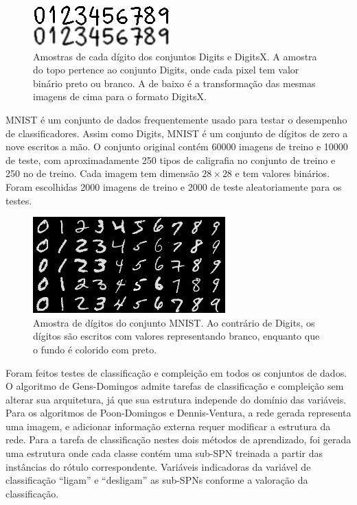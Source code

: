 \documentclass[12pt]{article}
\theoremstyle{plain}
\numberwithin{equation}{section}
\begin{document}
\begin{figure}[h]
  \centering\includegraphics[scale=1.5]{imgs/digits_sample.png}
  \captionsetup{justification=raggedright}
  \caption{Amostras de cada dígito dos conjuntos Digits e DigitsX. A amostra do topo pertence ao
    conjunto Digits, onde cada pixel tem valor binário preto ou branco. A de baixo é a
    transformação das mesmas imagens de cima para o formato DigitsX.}
\end{figure}

MNIST é um conjunto de dados frequentemente usado para testar o desempenho de classificadores.
Assim como Digits, MNIST é um conjunto de dígitos de zero a nove escritos a mão. O conjunto
original contém 60000 imagens de treino e 10000 de teste, com aproximadamente 250 tipos de
caligrafia no conjunto de treino e 250 no de treino. Cada imagem tem dimensão $28\times 28$ e tem
valores binários. Foram escolhidas 2000 imagens de treino e 2000 de teste aleatoriamente para os
testes.

\begin{figure}[h]
  \centering\includegraphics[scale=1.0]{imgs/mnist_sample.png}
  \captionsetup{justification=raggedright}
  \caption{Amostra de dígitos do conjunto MNIST\@. Ao contrário de Digits, os dígitos são escritos
    com valores representando branco, enquanto que o fundo é colorido com preto.}
\end{figure}

Foram feitos testes de classificação e compleição em todos os conjuntos de dados. O algoritmo de
Gens-Domingos admite tarefas de classificação e compleição sem alterar sua arquitetura, já que sua
estrutura independe do domínio das variáveis. Para os algoritmos de Poon-Domingos e Dennis-Ventura,
a rede gerada representa uma imagem, e adicionar informação externa requer modificar a estrutura da
rede. Para a tarefa de classificação nestes dois métodos de aprendizado, foi gerada uma estrutura
onde cada classe contém uma sub-SPN treinada a partir das instâncias do rótulo correspondente.
Variáveis indicadoras da variável de classificação ``ligam'' e ``desligam'' as sub-SPNs conforme a
valoração da classificação.
\end{document}
